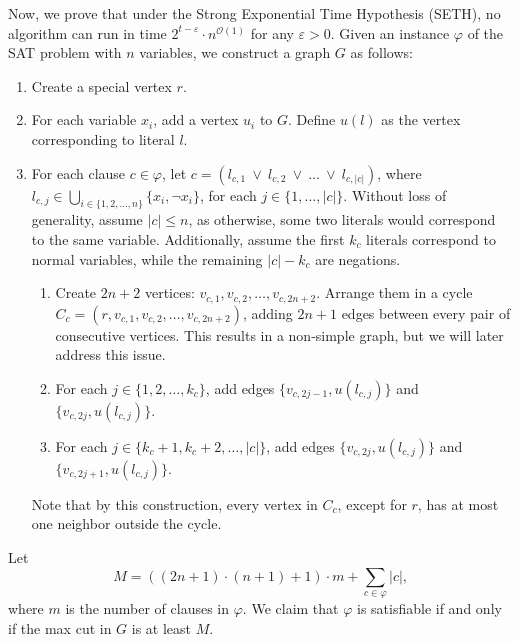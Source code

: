 \documentclass[12pt]{article}
\begin{document}
	Now, we prove that under the Strong Exponential Time Hypothesis (SETH), no
	algorithm can run in time \(2^{t - \varepsilon} \cdot n^{\mathcal{O}(1)}\)
	for any \(\varepsilon > 0\). Given an instance \(\varphi\) of the SAT
	problem with \(n\) variables, we construct a graph \(G\) as follows:
	\begin{enumerate}
		\item Create a special vertex \(r\).
		\item For each variable \(x_{i}\), add a vertex \(u_{i}\) to \(G\).
		      Define \(u(l)\) as the vertex corresponding to literal \(l\).
		\item For each clause \(c \in \varphi\), let \(c = (l_{c, 1} \ \vee \
		      l_{c, 2} \ \vee \ \ldots \ \vee \ l_{c, |c|})\), where \(l_{c, j}
		      \in \bigcup\limits_{i \in \{1, 2, \ldots, n\}} \{x_{i}, \neg
		      x_{i}\}\), for each \(j \in \{1, \ldots, |c|\}\). Without loss of
		      generality, assume \(|c| \leqslant n\), as otherwise, some two
		      literals would correspond to the same variable. Additionally,
		      assume the first \(k_{c}\) literals correspond to normal
		      variables, while the remaining \(|c| - k_{c}\) are negations.
		      \begin{enumerate}[label=\theenumi.\arabic*]
		          \item Create \(2n + 2\) vertices: \(v_{c, 1}, v_{c, 2},
		                \ldots, v_{c, 2n + 2}\). Arrange them in a cycle
		                \(C_{c} = (r, v_{c, 1}, v_{c, 2}, \allowbreak \ldots,
		                v_{c, 2n + 2})\), adding \(2n + 1\) edges between every
		                pair of consecutive vertices. This results in a
		                non-simple graph, but we will later address this issue.
		          \item For each \(j \in \{1, 2, \ldots, k_{c}\}\), add edges
		                \(\{v_{c, 2j - 1}, u(l_{c, j})\}\) and
		                \(\{v_{c, 2j}, u(l_{c, j})\}\).
		          \item For each \(j \in \{k_{c} + 1, k_{c} + 2, \ldots,
		                |c|\}\), add edges \(\{v_{c, 2j}, u(l_{c, j})\}\) and
		                \(\{v_{c, 2j + 1}, u(l_{c, j})\}\).
		      \end{enumerate}
		      Note that by this construction, every vertex in \(C_{c}\), except
		      for \(r\), has at most one neighbor outside the cycle.
	\end{enumerate}
	Let
	\[ M = ((2n + 1) \cdot (n + 1) + 1) \cdot m + \sum\limits_{c \in \varphi}
	|c| \text{,} \]
	where \(m\) is the number of clauses in \(\varphi\). We claim that
	\(\varphi\) is satisfiable if and only if the max cut in \(G\) is at least
	\(M\).
	
\end{document}
